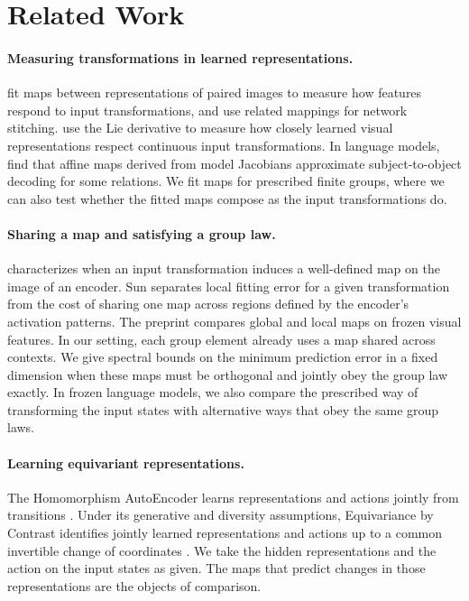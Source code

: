 \section{Related Work}
\label{sec:related-main}
\paragraph{Measuring transformations in learned representations.}
\citet{lenc2015understanding} fit maps between representations of paired images to measure how features respond to input transformations, and use related mappings for network stitching.
\citet{gruver2023lie} use the Lie derivative to measure how closely learned visual representations respect continuous input transformations.
In language models, \citet{hernandez2024linearity} find that affine maps derived from model Jacobians approximate subject-to-object decoding for some relations.
We fit maps for prescribed finite groups, where we can also test whether the fitted maps compose as the input transformations do.

\paragraph{Sharing a map and satisfying a group law.}
\citet[arXiv v1, Sections~III and V]{sun2026transformationlaws} characterizes when an input transformation induces a well-defined map on the image of an encoder.
Sun separates local fitting error for a given transformation from the cost of sharing one map across regions defined by the encoder's activation patterns. The preprint compares global and local maps on frozen visual features.
In our setting, each group element already uses a map shared across contexts. We give spectral bounds on the minimum prediction error in a fixed dimension when these maps must be orthogonal and jointly obey the group law exactly.
In frozen language models, we also compare the prescribed way of transforming the input states with alternative ways that obey the same group laws.

\paragraph{Learning equivariant representations.}
The Homomorphism AutoEncoder learns representations and actions jointly from transitions \citep{keurti2023homomorphism}.
Under its generative and diversity assumptions, Equivariance by Contrast identifies jointly learned representations and actions up to a common invertible change of coordinates \citep{schmidt2025equivariance}.
We take the hidden representations and the action on the input states as given. The maps that predict changes in those representations are the objects of comparison.

